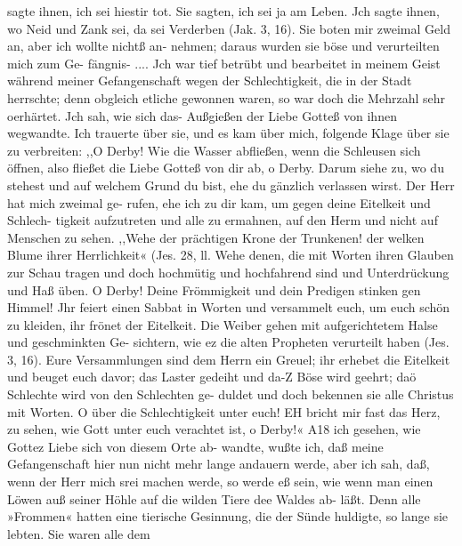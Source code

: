 
sagte ihnen, ich sei hiestir tot. Sie sagten, ich sei ja am Leben.
Jch sagte ihnen, wo Neid und Zank sei, da sei Verderben (Jak. 3, 16).
Sie boten mir zweimal Geld an, aber ich wollte nichtß an-
nehmen; daraus wurden sie böse und verurteilten mich zum Ge-
fängnis- ....
Jch war tief betrübt und bearbeitet in meinem Geist während
meiner Gefangenschaft wegen der Schlechtigkeit, die in der Stadt
herrschte; denn obgleich etliche gewonnen waren, so war doch die
Mehrzahl sehr oerhärtet. Jch sah, wie sich das- Außgießen der
Liebe Gotteß von ihnen wegwandte. Ich trauerte über sie, und
es kam über mich, folgende Klage über sie zu verbreiten:
,,O Derby! Wie die Wasser abfließen, wenn die Schleusen
sich öffnen, also fließet die Liebe Gotteß von dir ab, o Derby.
Darum siehe zu, wo du stehest und auf welchem Grund du bist,
ehe du gänzlich verlassen wirst. Der Herr hat mich zweimal ge-
rufen, ehe ich zu dir kam, um gegen deine Eitelkeit und Schlech-
tigkeit aufzutreten und alle zu ermahnen, auf den Herm und
nicht auf Menschen zu sehen. ,,Wehe der prächtigen Krone der
Trunkenen! der welken Blume ihrer Herrlichkeit« (Jes. 28, ll.
Wehe denen, die mit Worten ihren Glauben zur Schau tragen und
doch hochmütig und hochfahrend sind und Unterdrückung und Haß
üben. O Derby! Deine Frömmigkeit und dein Predigen stinken
gen Himmel! Jhr feiert einen Sabbat in Worten und versammelt
euch, um euch schön zu kleiden, ihr frönet der Eitelkeit. Die
Weiber gehen mit aufgerichtetem Halse und geschminkten Ge-
sichtern, wie ez die alten Propheten verurteilt haben (Jes. 3, 16).
Eure Versammlungen sind dem Herrn ein Greuel; ihr erhebet
die Eitelkeit und beuget euch davor; das Laster gedeiht und da-Z
Böse wird geehrt; daö Schlechte wird von den Schlechten ge-
duldet und doch bekennen sie alle Christus mit Worten. O über
die Schlechtigkeit unter euch! EH bricht mir fast das Herz, zu
sehen, wie Gott unter euch verachtet ist, o Derby!«
A18 ich gesehen, wie Gottez Liebe sich von diesem Orte ab-
wandte, wußte ich, daß meine Gefangenschaft hier nun nicht mehr
lange andauern werde, aber ich sah, daß, wenn der Herr mich
srei machen werde, so werde eß sein, wie wenn man einen
Löwen auß seiner Höhle auf die wilden Tiere dee Waldes ab-
läßt. Denn alle »Frommen« hatten eine tierische Gesinnung, die
der Sünde huldigte, so lange sie lebten. Sie waren alle dem


